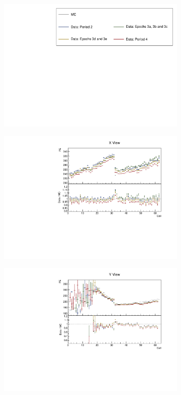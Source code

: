 \documentclass[12pt,a4paper]{article}
\begin{document}
\begin{figure}[!ht]
  \begin{subfigure}{\textwidth}
  \centering
    \includegraphics[height=0.2\linewidth]{essentialsec_tb/legend.pdf}
  \end{subfigure}
  \vspace*{2mm}

  \begin{subfigure}{0.5\textwidth}
    \includegraphics[width=\linewidth]{essentialsec_tb/pe_cell_x.pdf}
  \end{subfigure}
  \begin{subfigure}{0.5\textwidth}
    \includegraphics[width=\linewidth]{essentialsec_tb/pe_cell_y.pdf}

\end{subfigure}
\end{figure}
\end{document}
